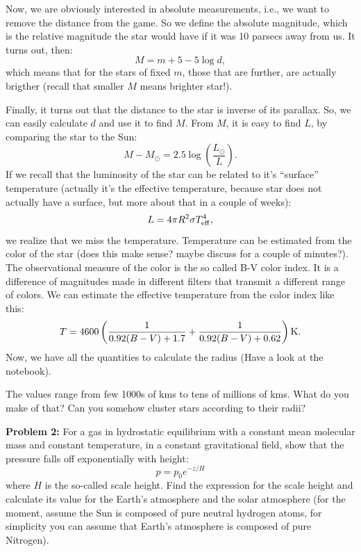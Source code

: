 \documentclass[12pt]{article}
\begin{document}
Now, we are obviously interested in absolute measurements, i.e., we
want to remove the distance from the game. So we define the absolute
magnitude, which is the relative magnitude the star would have if it
was 10 parsecs away from us. It turns out, then:
\begin{equation}
M = m + 5 - 5 \log d,
\end{equation}
which means that for the stars of fixed $m$, those that are further,
are actually brigther (recall that smaller $M$ means brighter star!).

Finally, it turns out that the distance to the star is inverse of its
parallax. So, we can easily calculate $d$ and use it to find $M$. From
$M$, it is easy to find $L$, by comparing the star to the Sun:
\begin{equation}
M - M_{\odot} = 2.5 \log \left(\frac{L_{\odot}}{L}\right).
\end{equation}
If we recall that the luminosity of the star can be related to it's
``surface'' temperature (actually it's the effective temperature,
because star does not actually have a surface, but more about that in
a couple of weeks):
\begin{equation}
L = 4\pi R^2 \sigma T_{\rm eff}^4,
\end{equation}
we realize that we miss the temperature. Temperature can be estimated
from the color of the star (does this make sense? maybe discuss for a
couple of minutes?). The observational measure of the color is the so
called B-V color index. It is a difference of magnitudes made in
different filters that transmit a different range of colors. We can
estimate the effective temperature from the color index like this:
\begin{equation}
T = 4600 \left ( \frac{1}{0.92 (B-V) + 1.7} + \frac{1}{0.92 (B-V) +
  0.62} \right ){\rm K}.
\end{equation}
Now, we have all the quantities to calculate the radius (Have a look
at the notebook).

The values range from few 1000s of kms to tens of millions of
kms. What do you make of that? Can you somehow cluster stars according
to their radii?

\pagebreak

{\bf Problem 2:} For a gas in hydrostatic equilibrium with a constant
mean molecular mass and constant temperature, in a constant
gravitational field, show that the pressure falls off exponentially
with height:
\begin{equation}
p = p_0 e^{-z/H}
\end{equation}
where $H$ is the so-called scale height. Find the expression for the
scale height and calculate its value for the Earth's atmosphere and
the solar atmosphere (for the moment, assume the Sun is composed of
pure neutral hydrogen atoms, for simplicity you can assume that
Earth's atmosphere is composed of pure Nitrogen).
\end{document}
